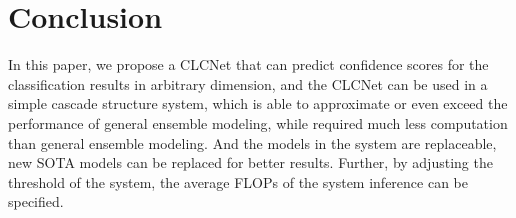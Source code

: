 \documentclass{article}
\begin{document}
\section{Conclusion}

In this paper, we propose a CLCNet that can predict confidence scores for the classification results in arbitrary dimension, and the CLCNet can be used in a simple cascade structure system, which is able to approximate or even exceed the performance of general ensemble modeling, while required much less computation than general ensemble modeling. And the models in the system are replaceable, new SOTA models can be replaced for better results. Further, by adjusting the threshold of the system, the average FLOPs of the system inference can be specified.




\end{document}
